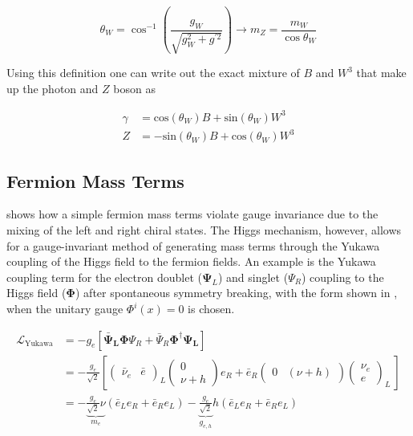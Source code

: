 \begin{equation}
\theta_W = \cos^{-1}\left( \frac{g_{W}}{\sqrt{g_{W}^{2}+g^{'2}}} \right) \rightarrow m_{Z} =
\frac{m_{W}}{\cos{\theta_{W}}}
\end{equation}

Using this definition one can write out the exact mixture of $B$ and $W^{3}$ that
make up the photon and $Z$ boson as

\begin{align}
\gamma &= \text{cos}(\theta_{W})B + \text{sin}(\theta_{W})W^{3} \\
Z &= -\text{sin}(\theta_{W})B + \text{cos}(\theta_{W})W^{3}
\end{align}

\subsection{Fermion Mass Terms} \label{sec:theory:fermion_mass}

 shows how a simple fermion mass terms violate gauge
invariance due to the mixing of the left and right chiral states.  The Higgs
mechanism, however, allows for a gauge-invariant method of generating mass
terms through the Yukawa coupling of the Higgs field to the fermion fields.  An
example is the Yukawa coupling term for the electron doublet
($\boldsymbol{\Psi}_{L}$) and singlet ($\Psi_R$) coupling to the Higgs field
($\boldsymbol{\Phi}$) after spontaneous symmetry breaking, with the form
shown in , when the unitary gauge $\Phi^{i}(x) = 0$
is chosen.

\begin{align}
\mathcal{L}_{\text{Yukawa}} &= - g_{e} \left[ \boldsymbol{\bar{\Psi}_L}
\boldsymbol{\Phi} \Psi_R + \bar{\Psi}_{R} \boldsymbol{\Phi}^{\dagger} \boldsymbol{\Psi_L}
\right] \\ &= - \frac{g_{e}}{\sqrt{2}} \left[ \left( \begin{matrix}
\bar{\nu}_{e} & \bar{e} \end{matrix} \right)_L \left( \begin{matrix} 0 \\ \nu +
h \end{matrix} \right) e_{R} + \bar{e}_{R} \left( \begin{matrix} 0 & (\nu + h)
\end{matrix} \right) \left( \begin{matrix} \nu_{e} \\ e \end{matrix} \right)_L \ \right] \\ &= - \underbrace{\frac{g_{e}}{\sqrt{2}}
\nu}_{m_{e}} \left( \bar{e}_{L}e_{R} + \bar{e}_{R}e_{L}  \right)
- \underbrace{\frac{g_{e}}{\sqrt{2}}}_{g_{e,h}} h \left(
\bar{e}_{L}e_{R} + \bar{e}_{R}e_{L}  \right) 
\end{align}

